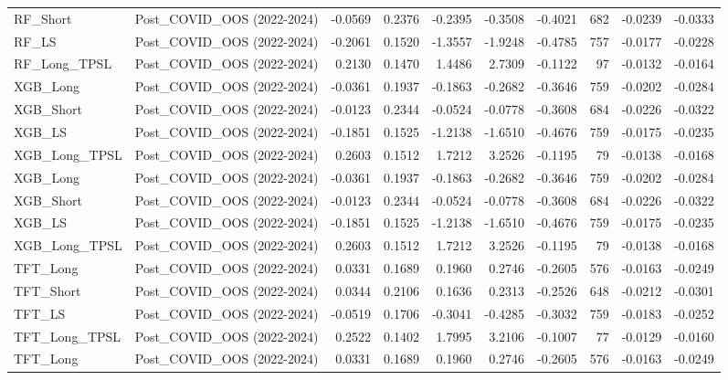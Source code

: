 \begin{tabular}{llrrrrrrrr}
\cline{1-10}
RF\_Short & Post\_COVID\_OOS (2022-2024) & -0.0569 & 0.2376 & -0.2395 & -0.3508 & -0.4021 & 682 & -0.0239 & -0.0333 \\
\cline{1-10}
RF\_LS & Post\_COVID\_OOS (2022-2024) & -0.2061 & 0.1520 & -1.3557 & -1.9248 & -0.4785 & 757 & -0.0177 & -0.0228 \\
\cline{1-10}
RF\_Long\_TPSL & Post\_COVID\_OOS (2022-2024) & 0.2130 & 0.1470 & 1.4486 & 2.7309 & -0.1122 & 97 & -0.0132 & -0.0164 \\
\cline{1-10}
XGB\_Long & Post\_COVID\_OOS (2022-2024) & -0.0361 & 0.1937 & -0.1863 & -0.2682 & -0.3646 & 759 & -0.0202 & -0.0284 \\
\cline{1-10}
XGB\_Short & Post\_COVID\_OOS (2022-2024) & -0.0123 & 0.2344 & -0.0524 & -0.0778 & -0.3608 & 684 & -0.0226 & -0.0322 \\
\cline{1-10}
XGB\_LS & Post\_COVID\_OOS (2022-2024) & -0.1851 & 0.1525 & -1.2138 & -1.6510 & -0.4676 & 759 & -0.0175 & -0.0235 \\
\cline{1-10}
XGB\_Long\_TPSL & Post\_COVID\_OOS (2022-2024) & 0.2603 & 0.1512 & 1.7212 & 3.2526 & -0.1195 & 79 & -0.0138 & -0.0168 \\
\cline{1-10}
XGB\_Long & Post\_COVID\_OOS (2022-2024) & -0.0361 & 0.1937 & -0.1863 & -0.2682 & -0.3646 & 759 & -0.0202 & -0.0284 \\
\cline{1-10}
XGB\_Short & Post\_COVID\_OOS (2022-2024) & -0.0123 & 0.2344 & -0.0524 & -0.0778 & -0.3608 & 684 & -0.0226 & -0.0322 \\
\cline{1-10}
XGB\_LS & Post\_COVID\_OOS (2022-2024) & -0.1851 & 0.1525 & -1.2138 & -1.6510 & -0.4676 & 759 & -0.0175 & -0.0235 \\
\cline{1-10}
XGB\_Long\_TPSL & Post\_COVID\_OOS (2022-2024) & 0.2603 & 0.1512 & 1.7212 & 3.2526 & -0.1195 & 79 & -0.0138 & -0.0168 \\
\cline{1-10}
TFT\_Long & Post\_COVID\_OOS (2022-2024) & 0.0331 & 0.1689 & 0.1960 & 0.2746 & -0.2605 & 576 & -0.0163 & -0.0249 \\
\cline{1-10}
TFT\_Short & Post\_COVID\_OOS (2022-2024) & 0.0344 & 0.2106 & 0.1636 & 0.2313 & -0.2526 & 648 & -0.0212 & -0.0301 \\
\cline{1-10}
TFT\_LS & Post\_COVID\_OOS (2022-2024) & -0.0519 & 0.1706 & -0.3041 & -0.4285 & -0.3032 & 759 & -0.0183 & -0.0252 \\
\cline{1-10}
TFT\_Long\_TPSL & Post\_COVID\_OOS (2022-2024) & 0.2522 & 0.1402 & 1.7995 & 3.2106 & -0.1007 & 77 & -0.0129 & -0.0160 \\
\cline{1-10}
TFT\_Long & Post\_COVID\_OOS (2022-2024) & 0.0331 & 0.1689 & 0.1960 & 0.2746 & -0.2605 & 576 & -0.0163 & -0.0249 \\

\end{tabular}

